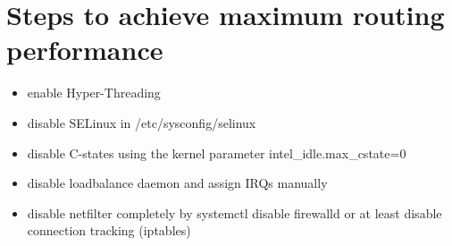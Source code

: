 \chapter{Steps to achieve maximum routing performance}
\begin{itemize}
\item enable Hyper-Threading
\item disable SELinux in /etc/sysconfig/selinux
\item disable C-states using the kernel parameter intel\_idle.max\_cstate=0
\item disable loadbalance daemon and assign IRQs manually
\item disable netfilter completely by systemctl disable firewalld or at least disable connection tracking (iptables)
\end{itemize}
